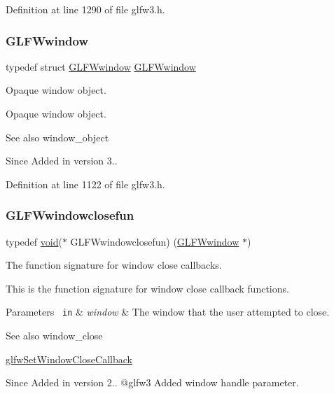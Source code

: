 Definition at line 1290 of file glfw3.\+h.

\mbox{\label{group__window_ga3c96d80d363e67d13a41b5d1821f3242}} 
\subsubsection{\texorpdfstring{GLFWwindow}{GLFWwindow}}
{\footnotesize\ttfamily typedef struct \mbox{\hyperlink{group__window_ga3c96d80d363e67d13a41b5d1821f3242}{G\+L\+F\+Wwindow}} \mbox{\hyperlink{group__window_ga3c96d80d363e67d13a41b5d1821f3242}{G\+L\+F\+Wwindow}}}



Opaque window object. 

Opaque window object.

\begin{DoxySeeAlso}{See also}
window\+\_\+object
\end{DoxySeeAlso}
\begin{DoxySince}{Since}
Added in version 3.. 
\end{DoxySince}


Definition at line 1122 of file glfw3.\+h.

\mbox{\label{group__window_ga93e7c2555bd837f4ed8b20f76cada72e}} 
\subsubsection{\texorpdfstring{GLFWwindowclosefun}{GLFWwindowclosefun}}
{\footnotesize\ttfamily typedef \mbox{\hyperlink{glad_8h_a950fc91edb4504f62f1c577bf4727c29}{void}}($\ast$  G\+L\+F\+Wwindowclosefun) (\mbox{\hyperlink{group__window_ga3c96d80d363e67d13a41b5d1821f3242}{G\+L\+F\+Wwindow}} $\ast$)}



The function signature for window close callbacks. 

This is the function signature for window close callback functions.


\begin{DoxyParams}[1]{Parameters}
\mbox{\texttt{ in}}  & {\em window} & The window that the user attempted to close.\\
\hline
\end{DoxyParams}
\begin{DoxySeeAlso}{See also}
window\+\_\+close 

\mbox{\hyperlink{group__window_ga5b827da350141c789acd64f5c4f7a0e1}{glfw\+Set\+Window\+Close\+Callback}}
\end{DoxySeeAlso}
\begin{DoxySince}{Since}
Added in version 2.. @glfw3 Added window handle parameter. 
\end{DoxySince}


